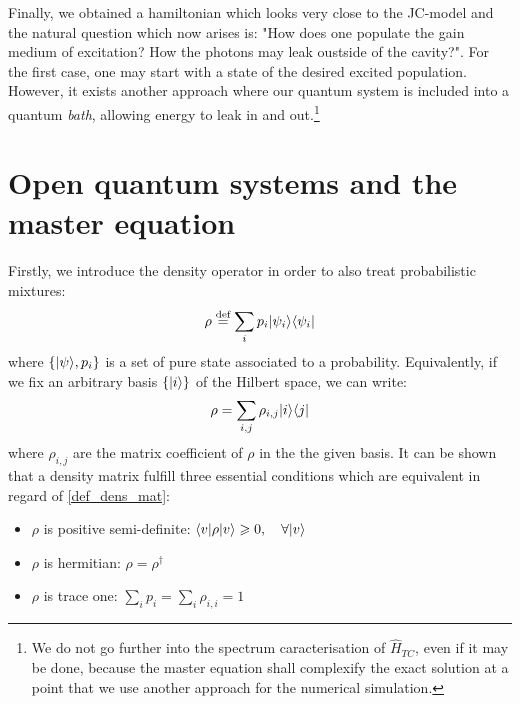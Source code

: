 \documentclass[12pt]{report}
\DeclarePairedDelimiter\bra{\langle}{\rvert}
\DeclarePairedDelimiter\ket{\lvert}{\rangle}
\begin{document}
Finally, we obtained a hamiltonian which looks very close to the JC-model and the natural question which now arises is: "How does one populate the gain medium of excitation? How the photons may leak oustside of the cavity?". For the first case, one may start with a state of the desired excited population. However, it exists another approach where our quantum system is included into a quantum \textit{bath}, allowing energy to leak in and out.\footnote{We do not go further into the spectrum caracterisation of $\hat{H}_{TC}$, even if it may be done, because the master equation shall complexify the exact solution at a point that we use another approach for the numerical simulation.}

\section{Open quantum systems and the master equation}
\paragraph{}

Firstly, we introduce the density operator in order to also treat probabilistic mixtures:
\begin{equation}
\label{def_dens_mat}
\rho \stackrel{\text{def}}{=} \sum_i p_i \ket{\psi_i}\bra{\psi_i}
\end{equation}
where $\left\lbrace \ket{\psi}, p_i \right\rbrace$ is a set of pure state associated to a probability. Equivalently, if we fix an arbitrary basis $\left\lbrace \ket{i} \right\rbrace$ of the Hilbert space, we can write:
\begin{equation}
\label{deftwo_dens_mat}
\rho = \sum_{i,j} \rho_{i,j} \ket{i}\bra{j}
\end{equation}
where $\rho_{i,j}$ are the matrix coefficient of $\rho$ in the the given basis. It can be shown that a density matrix fulfill three essential conditions which are equivalent in regard of \eqref{def_dens_mat}:
\begin{itemize}
	\item $\rho$ is positive semi-definite: $\bra{v} \rho \ket{v} \geqslant 0, \quad \forall \ket{v}$
	\item $\rho$ is hermitian: $\rho = \rho^\dagger$
	\item $\rho$ is trace one: $\sum_i p_i = \sum_i \rho_{i, i} = 1$
\end{itemize}
\end{document}
